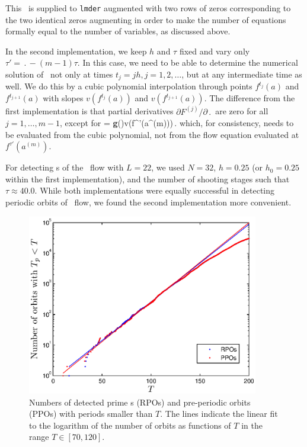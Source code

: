 This \jacobianM\ is supplied to {\tt lmder}
augmented with two rows of zeros corresponding to the two identical
zeros augmenting  in order to make the number of
equations formally equal to the number of variables,
as discussed above.

In the second implementation, we keep $h$ and $\tau$ fixed and vary
only $\tau' = \period{} - (m-1)\tau$.  In this case, we need to be
able to determine the numerical solution of \KSe\ not only at times
$t_j = jh, j = 1, 2, \ldots$, but at any intermediate time as well.
We do this by a cubic polynomial interpolation through points
$f^{t_j}(a)$ and $f^{t_{j+1}}(a)$ with slopes $v(f^{t_j}(a))$ and
$v(f^{t_{j+1}}(a))$.  The difference from the first implementation
is that partial derivatives $\partial F^{(j)}/\partial \period{}$
are zero for all $j = 1,\ldots,m-1$, except for
\beq
   =
  {\bf g}(\shift)v(f^{\tau'}(a^{(m)}))\,.
\eeq
which, for consistency, needs to be evaluated from the cubic
polynomial, not from the flow equation evaluated
at $f^{\tau'}(a^{(m)})$.

For detecting \rpo s of the \KS\ flow with $L = 22$, we used
$N = 32$, $h = 0.25$ (or $h_0 = 0.25$ within the first implementation),
and the number of shooting stages such that $\tau \approx 40.0$.
While both implementations were equally successful in detecting
periodic orbits of \KS\ flow, we found the second implementation more
convenient.


\begin{figure}[t]
\begin{center}
\includegraphics[width=0.9\textwidth, clip=true]{figs/ks22_Npos_30k.eps}
\end{center}
\caption{
Numbers of detected prime \rpo s (RPOs) and pre-periodic orbits (PPOs)
with periods smaller than $T$.  The lines indicate the linear fit
to the logarithm of the number of orbits as functions of $T$ in the
range $T \in [70, 120]$.
     } \label{fig:Npos}
\end{figure}

